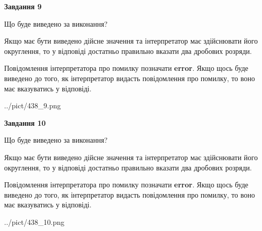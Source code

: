 \documentclass[12pt, ukrainian]{article}
\begin{document}
{\begin {Large}
{\begin {center}\textbf{Завдання 9}\end {center}}\par
Що буде виведено за виконання? \par

Якщо має бути виведено дійсне значення та інтерпретатор має здійснювати його округлення, 
то у відповіді достатньо правильно вказати два дробових розряди.

Повідомлення інтерпретатора про помилку позначати \textbf{error}.
Якщо щось буде виведено до того, як інтерпретатор видасть повідомлення про помилку, 
то воно має вказуватись у відповіді. \par

\begin{center}
	{../pict/438_9.png}
\end{center}
\newpage

{\begin {center}\textbf{Завдання 10}\end {center}}\par
Що буде виведено за виконання? \par

Якщо має бути виведено дійсне значення та інтерпретатор має здійснювати його округлення, 
то у відповіді достатньо правильно вказати два дробових розряди.

Повідомлення інтерпретатора про помилку позначати \textbf{error}.
Якщо щось буде виведено до того, як інтерпретатор видасть повідомлення про помилку, 
то воно має вказуватись у відповіді. \par

\begin{center}
	{../pict/438_10.png}
\end{center}
\newpage

\end {Large}}
\end{document}
